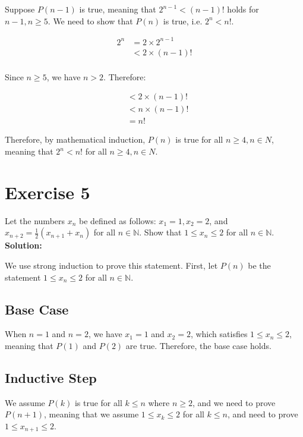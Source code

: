 \documentclass{article}
\begin{document}
Suppose $P(n-1)$ is true, meaning that $2^{n-1} < (n-1)!$ holds for $n-1, n \geq 5$. We need to show that $P(n)$ is true, i.e. $2^n < n!$.

\begin{align*}
    2^n & = 2 \times 2^{n-1} \\
    & < 2 \times (n-1)! \\
\end{align*}

Since $n \geq 5$, we have $n > 2$. Therefore:

\begin{align*}
    & < 2 \times (n-1)! \\
    & < n \times (n-1)! \\
    & = n!
\end{align*}

Therefore, by mathematical induction, $P(n)$ is true for all $n \geq 4, n \in N$, meaning that $2^n < n!$ for all $n \geq 4, n \in N$.

\newpage

\section*{Exercise 5}

Let the numbers $x_n$ be defined as follows: $x_1 = 1, x_2 = 2$, and $x_{n+2} = \frac{1}{2}(x_{n+1} + x_n)$ for all $n \in \mathbb{N}$. Show that $1 \leq x_n \leq 2$ for all $n \in \mathbb{N}$.\\

\textbf{Solution:}

We use strong induction to prove this statement. First, let $P(n)$ be the statement $1 \leq x_n \leq 2$ for all $n \in \mathbb{N}$.

\subsection*{Base Case}

When $n = 1$ and $n = 2$, we have $x_1 = 1$ and $x_2 = 2$, which satisfies $1 \leq x_n \leq 2$, meaning that $P(1)$ and $P(2)$ are true. Therefore, the base case holds.

\subsection*{Inductive Step}

We assume $P(k)$ is true for all $k \leq n$ where $n \geq 2$, and we need to prove $P(n+1)$, meaning that we assume $1 \leq x_k \leq 2$ for all $k \leq n$, and need to prove $1 \leq x_{n+1} \leq 2$. \\
\end{document}
